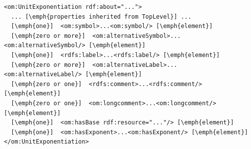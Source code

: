 
\begin{lstlisting}
<om:UnitExponentiation rdf:about="...">
  ... [\emph{properties inherited from TopLevel}] ...
  [\emph{one}]  <om:symbol>...<om:symbol/> [\emph{element}]
  [\emph{zero or more}]  <om:alternativeSymbol>...<om:alternativeSymbol/> [\emph{element}]
  [\emph{one}]  <rdfs:label>...<rdfs:label/> [\emph{element}]
  [\emph{zero or more}]  <om:alternativeLabel>...<om:alternativeLabel/> [\emph{element}]
  [\emph{zero or one}]  <rdfs:comment>...<rdfs:comment/> [\emph{element}]
  [\emph{zero or one}]  <om:longcomment>...<om:longcomment/> [\emph{element}]
  [\emph{one}]  <om:hasBase rdf:resource="..."/> [\emph{element}]
  [\emph{one}]  <om:hasExponent>...<om:hasExponent/> [\emph{element}]
</om:UnitExponentiation>
\end{lstlisting}


